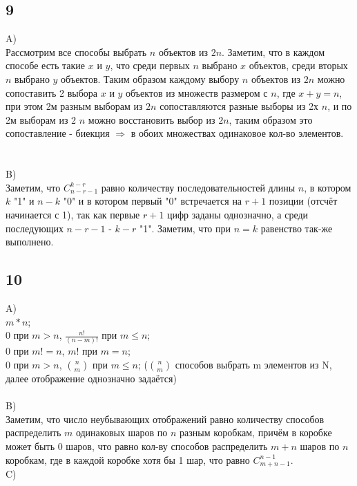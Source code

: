 		\subsection{9}
		A)\\
		Рассмотрим все способы выбрать $n$ объектов из $2n$. Заметим, что в каждом способе есть такие $x$ и $y$, что среди первых $n$ выбрано $x$ объектов, среди вторых $n$ выбрано $y$ объектов. Таким образом каждому выбору $n$ объектов из $2n$ можно сопоставить 2 выбора $x$ и $y$ объектов из множеств размером с $n$, где $x+y = n$, при этом 2м разным выборам из $2n$ сопоставляются разные выборы из 2х $n$, и по 2м выборам из 2 $n$ можно восстановить выбор из $2n$, таким образом это сопоставление - биекция $\Rightarrow$ в обоих множествах одинаковое кол-во элементов.\\ \\
		\\
		B)\\
		Заметим, что $C_{n-r-1}^{k-r}$ равно количеству последовательностей длины $n$, в котором $k$ "1" и $n-k$ "0" и в котором первый "0" встречается на $r+1$ позиции (отсчёт начинается с 1), так как первые $r+1$ цифр заданы однозначно, а среди последующих $n-r-1$ - $k-r$ "1". Заметим, что при $n = k$ равенство так-же выполнено.
		
		\subsection{10}
		A)\\
		$m*n$;\\
		0 при $m > n$, $\frac{n!}{(n-m)!}$ при $m \leqslant n$;\\
		0 при $m!=n$, $m!$ при $m = n$;\\
		0 при $m > n$, ${n \choose m}$ при $m \leqslant n$; (${n \choose m}$ способов выбрать m элементов из N, далее отображение однозначно задаётся) \\ 
		\\
		B)\\
		Заметим, что число неубывающих отображений равно количеству способов распределить $m$ одинаковых шаров по $n$ разным коробкам, причём в коробке может быть 0 шаров, что равно кол-ву способов распределить $m+n$ шаров по $n$ коробкам, где в каждой коробке хотя бы 1 шар, что равно $C_{m+n-1}^{n-1}$.
		\\
		C)\\
		
		
